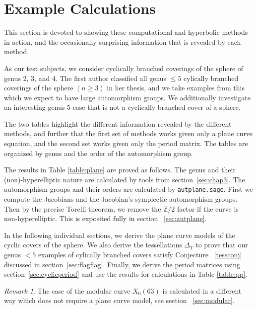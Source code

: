 \documentclass[12pt,reqno]{amsart}
\newcommand{\Z}{\mathbb{Z}}
\theoremstyle{definition}
\theoremstyle{remark}
\newtheorem*{remark}{Remark}
\begin{document}
\section{Example Calculations}
\label{sec:examples}
This section is devoted to showing these computational and hyperbolic methods in action, and the occasionally surprising information that is revealed by each method. 

As our test subjects, we consider cyclically branched coverings of the sphere of genus 2, 3, and 4. The first author classified all genus $\leq 5$ cylically branched coverings of the sphere $(n \geq 3)$ in her thesis, and we take examples from this which we expect to have large automorphism groups. We additionally investigate an interesting genus 5 case that is not a cyclically branched cover of a sphere.

The two tables highlight the different information revealed by the different methods, and further that the first set of methods works given only a plane curve equation, and the second set works given only the period matrix. The tables are organized by genus and the order of the automorphism group. 





The results in Table \ref{table:plane} are proved as follows. The genus and their (non)-hyperelliptic nature are calculated by tools from section~\ref{sec:chap3}. The automorphism groups and their orders are calculated by \texttt{autplane.sage}. First we compute the Jacobians and the Jacobian's symplectic automorphism groups. Then by the precise Torelli theorem, we remove the $\Z/2$ factor if the curve is non-hyperelliptic. This is exposited fully in section ~\ref{sec:autplane}. 

In the following individual sections, we derive the plane curve models of the cyclic covers of the sphere. We also derive the tessellations $\Delta_T$ to prove that our genus $< 5$ examples of cylically branched covers satisfy Conjecture ~\ref{tessconj} discussed in section~\ref{sec:flagflag}. Finally, we derive the period matrices using section~\ref{sec:cyclicperiod} and use the results for calculations in Table \ref{table:pp}. 


\begin{remark} The case of the modular curve $X_0(63)$ is calculated in a different way which does not require a plane curve model, see section ~\ref{sec:modular}. \end{remark}
\end{document}
